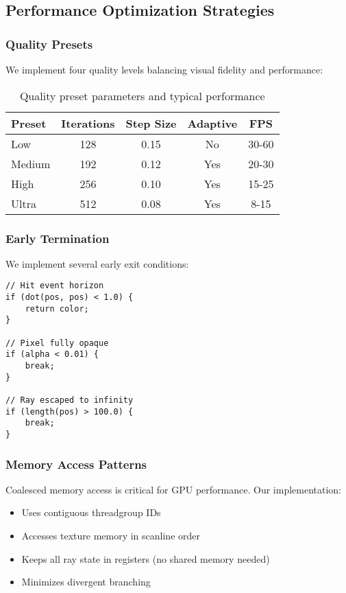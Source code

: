 \documentclass[12pt,a4paper]{article}
\theoremstyle{definition}
\theoremstyle{remark}
\begin{document}
\subsection{Performance Optimization Strategies}

\subsubsection{Quality Presets}

We implement four quality levels balancing visual fidelity and performance:

\begin{table}[H]
\centering
\caption{Quality preset parameters and typical performance}
\begin{tabular}{lcccc}
\toprule
\textbf{Preset} & \textbf{Iterations} & \textbf{Step Size} & \textbf{Adaptive} & \textbf{FPS} \\
\midrule
Low & 128 & 0.15 & No & 30-60 \\
Medium & 192 & 0.12 & Yes & 20-30 \\
High & 256 & 0.10 & Yes & 15-25 \\
Ultra & 512 & 0.08 & Yes & 8-15 \\
\bottomrule
\end{tabular}
\label{tab:quality_presets}
\end{table}

\subsubsection{Early Termination}

We implement several early exit conditions:

\begin{lstlisting}[style=metalstyle, caption=Early termination conditions]
// Hit event horizon
if (dot(pos, pos) < 1.0) {
    return color;
}

// Pixel fully opaque
if (alpha < 0.01) {
    break;
}

// Ray escaped to infinity
if (length(pos) > 100.0) {
    break;
}
\end{lstlisting}

\subsubsection{Memory Access Patterns}

Coalesced memory access is critical for GPU performance. Our implementation:

\begin{itemize}
    \item Uses contiguous threadgroup IDs
    \item Accesses texture memory in scanline order
    \item Keeps all ray state in registers (no shared memory needed)
    \item Minimizes divergent branching
\end{itemize}
\end{document}
